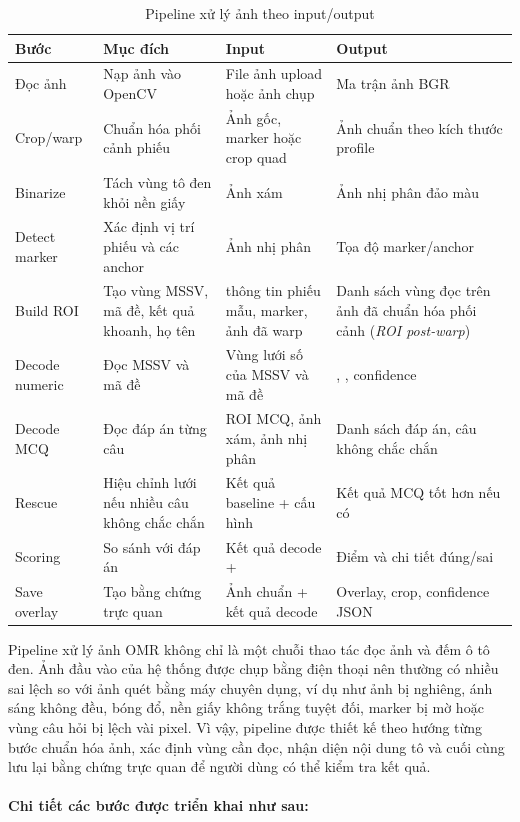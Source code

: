 \begin{longtable}{|L{2.6cm}|L{3.9cm}|L{3.55cm}|L{3.55cm}|}
\caption{Pipeline xử lý ảnh theo input/output}
\label{tab:pipeline-io}\\
\hline
\textbf{Bước} & \textbf{Mục đích} & \textbf{Input} & \textbf{Output} \\
\hline
Đọc ảnh & Nạp ảnh vào OpenCV & File ảnh upload hoặc ảnh chụp & Ma trận ảnh BGR \\
\hline
Crop/warp & Chuẩn hóa phối cảnh phiếu & Ảnh gốc, marker hoặc crop quad & Ảnh chuẩn theo kích thước profile \\
\hline
Binarize & Tách vùng tô đen khỏi nền giấy & Ảnh xám & Ảnh nhị phân đảo màu \\
\hline
Detect marker & Xác định vị trí phiếu và các anchor & Ảnh nhị phân & Tọa độ marker/anchor \\
\hline
Build ROI & Tạo vùng MSSV, mã đề, kết quả khoanh, họ tên & thông tin phiếu mẫu, marker, ảnh đã warp & Danh sách vùng đọc trên ảnh đã chuẩn hóa phối cảnh (\textit{ROI post-warp}) \\
\hline
Decode numeric & Đọc MSSV và mã đề & Vùng lưới số của MSSV và mã đề & , , confidence \\
\hline
Decode MCQ & Đọc đáp án từng câu & ROI MCQ, ảnh xám, ảnh nhị phân & Danh sách đáp án, câu không chắc chắn \\
\hline
Rescue & Hiệu chỉnh lưới nếu nhiều câu không chắc chắn & Kết quả baseline + cấu hình  & Kết quả MCQ tốt hơn nếu có \\
\hline
Scoring & So sánh với đáp án & Kết quả decode +  & Điểm và chi tiết đúng/sai \\
\hline
Save overlay & Tạo bằng chứng trực quan & Ảnh chuẩn + kết quả decode & Overlay, crop, confidence JSON \\
\hline
\end{longtable}

Pipeline xử lý ảnh OMR không chỉ là một chuỗi thao tác đọc ảnh và đếm ô tô đen. Ảnh đầu vào của hệ thống được chụp bằng điện thoại nên thường có nhiều sai lệch so với ảnh quét bằng máy chuyên dụng, ví dụ như ảnh bị nghiêng, ánh sáng không đều, bóng đổ, nền giấy không trắng tuyệt đối, marker bị mờ hoặc vùng câu hỏi bị lệch vài pixel. Vì vậy, pipeline được thiết kế theo hướng từng bước chuẩn hóa ảnh, xác định vùng cần đọc, nhận diện nội dung tô và cuối cùng lưu lại bằng chứng trực quan để người dùng có thể kiểm tra kết quả. \\
\paragraph{Chi tiết các bước được triển khai như sau:}

